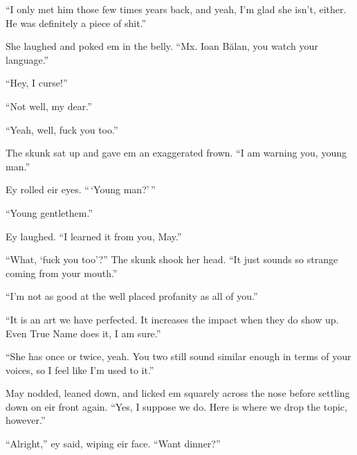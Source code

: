 ``I only met him those few times years back, and yeah, I'm glad she isn't, either. He was definitely a piece of shit.''

She laughed and poked em in the belly. ``Mx. Ioan Bălan, you watch your language.''

``Hey, I curse!''

``Not well, my dear.''

``Yeah, well, fuck you too.''

The skunk sat up and gave em an exaggerated frown. ``I am warning you, young man.''

Ey rolled eir eyes. ``\,`Young man?'\,''

``Young gentlethem.''

Ey laughed. ``I learned it from you, May.''

``What, `fuck you too'?'' The skunk shook her head. ``It just sounds so strange coming from your mouth.''

``I'm not as good at the well placed profanity as all of you.''

``It is an art we have perfected. It increases the impact when they do show up. Even True Name does it, I am sure.''

``She has once or twice, yeah. You two still sound similar enough in terms of your voices, so I feel like I'm used to it.''

May nodded, leaned down, and licked em squarely across the nose before settling down on eir front again. ``Yes, I suppose we do. Here is where we drop the topic, however.''

``Alright,'' ey said, wiping eir face. ``Want dinner?''
